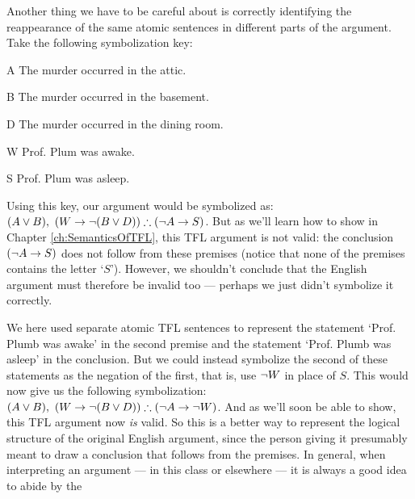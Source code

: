 Another thing we have to be careful about is correctly identifying the reappearance of the same atomic sentences in different parts of the argument.  Take the following symbolization key:
\begin{ekey}
  \item[A] The murder occurred in the attic.
  \item[B] The murder occurred in the basement.
  \item[D] The murder occurred in the dining room.
  \item[W] Prof. Plum was awake.
  \item[S] Prof. Plum was asleep.
\end{ekey}
Using this key, our argument would be symbolized as: $(A \vee B), \ (W \rightarrow \neg(B \vee D)) \therefore (\neg A \rightarrow S)$.  But as we'll learn how to show in Chapter \ref{ch:SemanticsOfTFL}, this TFL argument is not valid: the conclusion $ (\neg A \rightarrow S)$ does not follow from these premises (notice that none of the premises contains the letter `$S$').  However, we shouldn't conclude that the English argument must therefore be invalid too --- perhaps we just didn't symbolize it correctly.  

We here used separate atomic TFL sentences to represent the statement `Prof. Plumb was awake' in the second premise and the statement `Prof. Plumb was asleep' in the conclusion.  But we could instead symbolize the second of these statements as the negation of the first, that is, use $\neg W$ in place of $S$.  This would now give us the following symbolization: $(A \vee B), \ (W \rightarrow \neg(B \vee D)) \therefore (\neg A \rightarrow \neg W)$.  And as we'll soon be able to show, this TFL argument now \emph{is} valid.  So this is a better way to represent the logical structure of the original English argument, since the person giving it presumably meant to draw a conclusion that follows from the premises.  In general, when interpreting an argument --- in this class or elsewhere --- it is always a good idea to abide by the 



